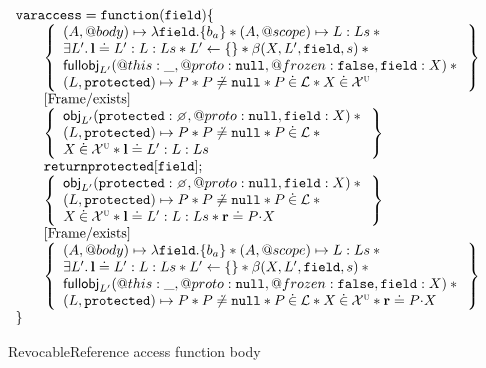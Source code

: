 \documentclass[a4paper]{article}
\begin{document}
\begin{figure}
\[
  \begin{array}{l}
    \js{var access = function(field) \{} \\
    \begin{array}{@{\qquad}l}
      \logic{
        (A, @body) \mapsto \lambda \js{field}.\{b_a\} \sep
          (A, @scope) \mapsto L:Ls \sep {} \\
        \exists L' \st \ls \doteq L' : L : Ls \sep
          L' \bp \{\} \sep \bpGen(X, L', \js{field}, s) \sep {} \\
        \fullobj_{L'}(@this: \_, @proto: \nil, @frozen: \false, \js{field}: X)
          \sep {} \\
        (L, \js{protected}) \mapsto P \sep P \not\doteq \nil \sep P \dotin \loc
          \sep X \dotin \uvars
      } \\
      \step{Frame/exists} \\
      \logic{
        \obj_{L'}(\js{protected}: \none, @proto: \nil, \js{field}: X) \sep {} \\
        (L, \js{protected}) \mapsto P \sep P \not\doteq \nil \sep P \dotin \loc
          \sep {} \\
        X \dotin \uvars \sep \ls \doteq L':L:Ls
      } \\
      \js{return protected[field];} \\
      \logic{
        \obj_{L'}(\js{protected}: \none, @proto: \nil, \js{field}: X) \sep {} \\
        (L, \js{protected}) \mapsto P \sep
        P \not\doteq \nil \sep P \dotin \loc \sep {} \\
        X \dotin \uvars \sep \ls \doteq L':L:Ls \sep \rv \doteq \fld{P}{X}
      } \\
      \step{Frame/exists} \\
      \logic{
        (A, @body) \mapsto \lambda \js{field}.\{b_a\} \sep
          (A, @scope) \mapsto L:Ls \sep {} \\
        \exists L' \st \ls \doteq L' : L : Ls \sep
          L' \bp \{\} \sep \bpGen(X, L', \js{field}, s) \sep {} \\
        \fullobj_{L'}(@this: \_, @proto: \nil, @frozen: \false, \js{field}: X)
          \sep {} \\
        (L, \js{protected}) \mapsto P \sep P \not\doteq \nil \sep P \dotin \loc
          \sep X \dotin \uvars \sep \rv \doteq \fld{P}{X}
      } \\
    \end{array} \\
    \js{\}}
  \end{array}
\]
\caption{RevocableReference access function body}
\label{rr-access}
\end{figure}
\end{document}
